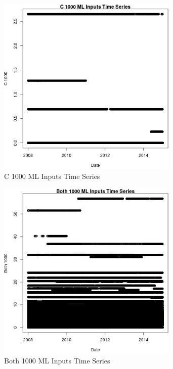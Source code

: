 \begin{figure} 
\centering  
\includegraphics[width=0.77\textwidth]{Code_Outputs/ML_input_report_ML_input_PM25_Step5_part_d_de_duplicated_aves_ML_input_C_1000vDate.jpg} 
\caption{\label{fig:ML_input_report_ML_input_PM25_Step5_part_d_de_duplicated_aves_ML_inputC_1000vDate}C 1000 ML Inputs Time Series} 
\end{figure} 
 

\begin{figure} 
\centering  
\includegraphics[width=0.77\textwidth]{Code_Outputs/ML_input_report_ML_input_PM25_Step5_part_d_de_duplicated_aves_ML_input_Both_1000vDate.jpg} 
\caption{\label{fig:ML_input_report_ML_input_PM25_Step5_part_d_de_duplicated_aves_ML_inputBoth_1000vDate}Both 1000 ML Inputs Time Series} 
\end{figure} 
 

